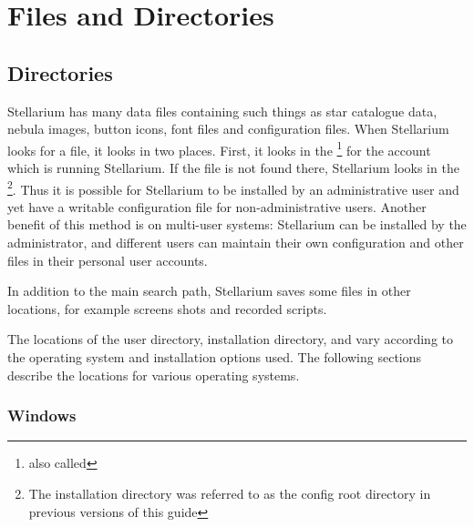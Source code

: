 
\chapter{Files and Directories}
\label{sec:FilesAndDirectories}

\section{Directories}
\label{sec:Directories}

Stellarium has many data files containing such things as star catalogue
data, nebula images, button icons, font files and configuration files.
When Stellarium looks for a file, it looks in two places. First, it
looks in the \footnote{also called } for the account which is running
Stellarium. If the file is not found there, Stellarium looks in the
\footnote{The installation directory was
  referred to as the config root directory in previous versions of this
  guide}. Thus it is possible for Stellarium to be installed by an
administrative user and yet have a writable configuration file for
non-administrative users. Another benefit of this method is on
multi-user systems: Stellarium can be installed by the administrator,
and different users can maintain their own configuration and other files
in their personal user accounts.

In addition to the main search path, Stellarium saves some files in
other locations, for example screens shots and recorded scripts.

The locations of the user directory, installation directory,
 and  vary
according to the operating system and installation options used. The
following sections describe the locations for various operating systems.

\subsection{Windows}
\label{sec:FilesAndDirectories:Windows}

